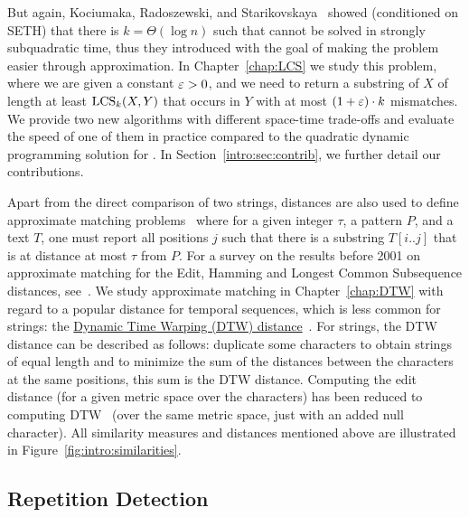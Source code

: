 But again, Kociumaka, Radoszewski, and Starikovskaya~\cite{DBLP:journals/algorithmica/KociumakaRS19} showed (conditioned on SETH) that there is $k=\Theta(\log n)$ such that \kLCS cannot be solved in strongly subquadratic time, thus they introduced \kApproxLCS with the goal of making the problem easier through approximation.
In Chapter~\ref{chap:LCS} we study this problem, where we are given a constant $\varepsilon > 0$, and we need to return a substring of $X$ of length at least $\mathrm{LCS}_{k}(X,Y)$ that occurs in $Y$ with at most $(1+\varepsilon) \cdot k$ mismatches. We provide two new algorithms with different space-time trade-offs and evaluate the speed of one of them in practice compared to the quadratic dynamic programming solution for \kLCS. In Section~\ref{intro:sec:contrib}, we further detail our contributions.

Apart from the direct comparison of two strings, distances are also used to define approximate matching problems~\cite{landau1986efficient,landau1989fast} where for a given integer $\tau$, a pattern $P$, and a text $T$, one must report all positions $j$ such that there is a substring $T[i..j]$ that is at distance at most $\tau$ from $P$.
For a survey on the results before 2001 on approximate matching for the Edit, Hamming and Longest Common Subsequence distances, see~\cite{navarro2001guided}.
We study approximate matching in Chapter~\ref{chap:DTW} with regard to a popular distance for temporal sequences, which is less common for strings: the \underline{Dynamic Time Warping (DTW) distance}~\cite{sakoe1978dynamic}. For strings, the DTW distance can be described as follows: duplicate some characters to obtain strings of equal length and to minimize the sum of the distances between the characters at the same positions, this sum is the DTW distance. Computing the edit distance (for a given metric space over the characters) has been reduced to computing DTW~\cite{DBLP:conf/icalp/Kuszmaul19} (over the same metric space, just with an added null character).
%
All similarity measures and distances mentioned above are illustrated in Figure~\ref{fig:intro:similarities}.



\subsection{Repetition Detection}

